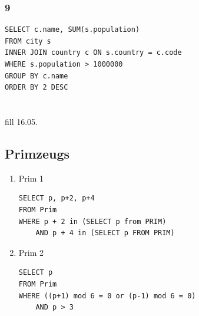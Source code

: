\subsubsection{9}
\begin{lstlisting}
SELECT c.name, SUM(s.population)
FROM city s
INNER JOIN country c ON s.country = c.code
WHERE s.population > 1000000
GROUP BY c.name
ORDER BY 2 DESC
\end{lstlisting}

\section{}
fill 16.05.
\subsection{Primzeugs}
\begin{enumerate}
\item Prim 1 \\
\begin{lstlisting}
SELECT p, p+2, p+4
FROM Prim
WHERE p + 2 in (SELECT p from PRIM)
	AND p + 4 in (SELECT p FROM PRIM)
\end{lstlisting}
\item Prim 2\\
\begin{lstlisting}
SELECT p
FROM Prim
WHERE ((p+1) mod 6 = 0 or (p-1) mod 6 = 0)
	AND p > 3
\end{lstlisting}
\end{enumerate}

\section{}
